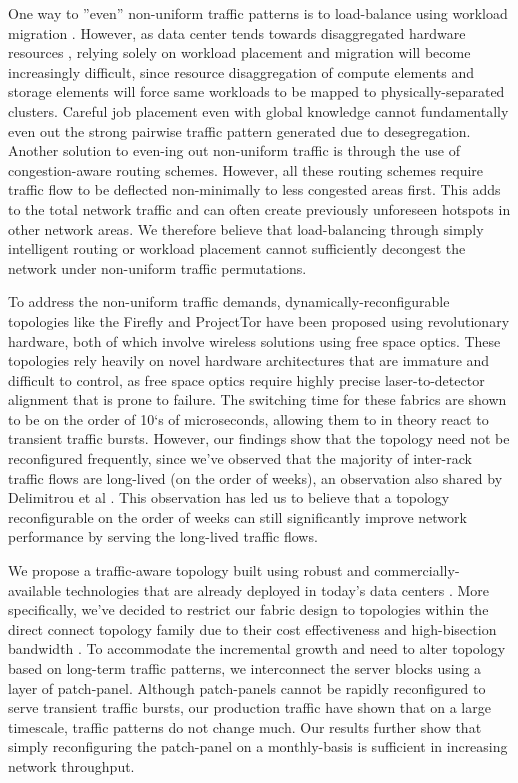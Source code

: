 \documentclass[sigconf]{acmart}
\begin{document}
One way to ''even'' non-uniform traffic patterns is to load-balance using workload migration \cite{jain2012topology}. However, as data center tends towards disaggregated hardware resources \cite{papaioannou2016benefits}, relying solely on workload placement and migration will become increasingly difficult, since resource disaggregation of compute elements and storage elements will force same workloads to be mapped to physically-separated clusters. Careful job placement even with global knowledge cannot fundamentally even out the strong pairwise traffic pattern generated due to desegregation. Another solution to even-ing out non-uniform traffic is through the use of congestion-aware routing schemes. However, all these routing schemes require traffic flow to be deflected non-minimally to less congested areas first. This adds to the total network traffic and can often create previously unforeseen hotspots in other network areas. We therefore believe that load-balancing through simply intelligent routing or workload placement cannot sufficiently decongest the network under non-uniform traffic permutations. 

To address the non-uniform traffic demands, dynamically-reconfigurable topologies like the Firefly \cite{hamedazimi2014firefly} and ProjectTor \cite{ghobadi2016projector} have been proposed using revolutionary hardware, both of which involve wireless solutions using free space optics. These topologies rely heavily on novel hardware architectures that are immature and difficult to control, as free space optics require highly precise laser-to-detector alignment that is prone to failure. The switching time for these fabrics are shown to be on the order of 10`s of microseconds, allowing them to in theory react to transient traffic bursts. However, our findings show that the topology need not be reconfigured frequently, since we've observed that the majority of inter-rack traffic flows are long-lived (on the order of weeks), an observation also shared by Delimitrou et al \cite{delimitrou2012echo}. This observation has led us to believe that a topology reconfigurable on the order of weeks can still significantly improve network performance by serving the long-lived traffic flows.

We propose a traffic-aware topology built using robust and commercially-available technologies that are already deployed in today's data centers \cite{zhao2018minimal}. More specifically, we've decided to restrict our fabric design to topologies within the direct connect topology family due to their cost effectiveness and high-bisection bandwidth \cite{radhakrishnan2013dahu}. To accommodate the incremental growth and need to alter topology based on long-term traffic patterns, we interconnect the server blocks using a layer of patch-panel. Although patch-panels cannot be rapidly reconfigured to serve transient traffic bursts, our production traffic have shown that on a large timescale, traffic patterns do not change much. Our results further show that simply reconfiguring the patch-panel on a monthly-basis is sufficient in increasing network throughput. 
\end{document}
